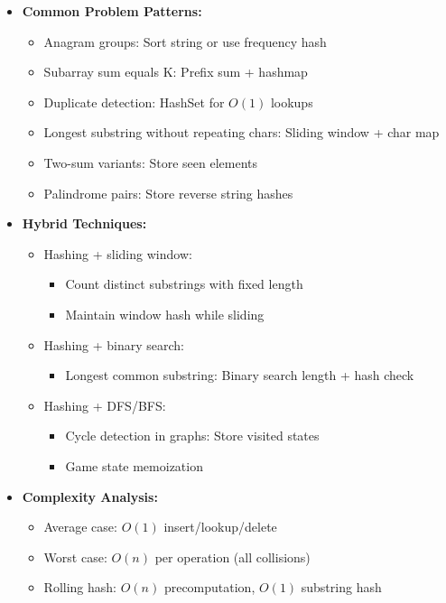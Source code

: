 \documentclass[a4paper,10pt]{book}
\begin{document}
\begin{itemize}
    \item \textbf{Common Problem Patterns:}
    \begin{itemize}
        \item Anagram groups: Sort string or use frequency hash
        \item Subarray sum equals K: Prefix sum + hashmap
        \item Duplicate detection: HashSet for $O(1)$ lookups
        \item Longest substring without repeating chars: Sliding window + char map
        \item Two-sum variants: Store seen elements
        \item Palindrome pairs: Store reverse string hashes
    \end{itemize}
    
    \item \textbf{Hybrid Techniques:}
    \begin{itemize}
        \item Hashing + sliding window: 
        \begin{itemize}
            \item Count distinct substrings with fixed length
            \item Maintain window hash while sliding
        \end{itemize}
        \item Hashing + binary search:
        \begin{itemize}
            \item Longest common substring: Binary search length + hash check
        \end{itemize}
        \item Hashing + DFS/BFS:
        \begin{itemize}
            \item Cycle detection in graphs: Store visited states
            \item Game state memoization
        \end{itemize}
    \end{itemize}
    
    \item \textbf{Complexity Analysis:}
    \begin{itemize}
        \item Average case: $O(1)$ insert/lookup/delete
        \item Worst case: $O(n)$ per operation (all collisions)
        \item Rolling hash: $O(n)$ precomputation, $O(1)$ substring hash
    \end{itemize}
    

\end{itemize}
\end{document}
